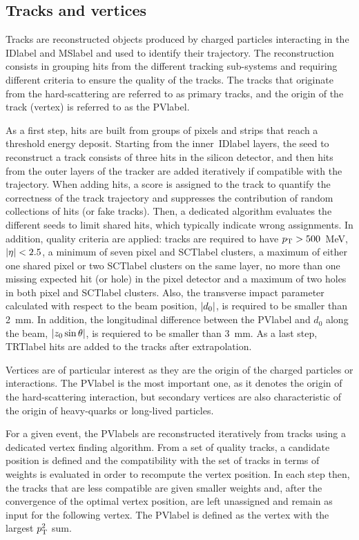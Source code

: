 \subsection{Tracks and vertices}

Tracks are reconstructed objects produced by charged particles interacting in the \acrshort{IDlabel} and \acrshort{MSlabel} and used to identify their trajectory. The reconstruction consists in grouping hits from the different tracking sub-systems and requiring different criteria to ensure the quality of the tracks. The tracks that originate from the hard-scattering are referred to as primary tracks, and the origin of the track (vertex) is referred to as the \acrfull{PVlabel}.

As a first step, hits are built from groups of pixels and strips that reach a threshold energy deposit. Starting from the inner~\acrshort{IDlabel} layers, the seed to reconstruct a track consists of three hits in the silicon detector, and then hits from the outer layers of the tracker are added iteratively if compatible with the trajectory. When adding hits, a score is assigned to the track to quantify the correctness of the track trajectory and suppresses the contribution of random collections of hits (or fake tracks). Then, a dedicated algorithm evaluates the different seeds to limit shared hits, which typically indicate wrong assignments. In addition, quality criteria are applied: tracks are required to have $p_{\text{T}}>500$~MeV, $\abs{\eta}<2.5$, a minimum of seven pixel and \acrshort{SCTlabel} clusters, a maximum of either one shared pixel or two \acrshort{SCTlabel} clusters on the same layer, no more than one missing expected hit (or hole) in the pixel detector and a maximum of two holes in both pixel and \acrshort{SCTlabel} clusters. Also, the transverse impact parameter calculated with respect to the beam position, $\abs{d_0}$, is required to be smaller than 2~mm. In addition, the longitudinal difference between the \acrshort{PVlabel} and $d_0$ along the beam, $\abs{z_0 \sin\theta}$, is requiered to be smaller than 3~mm. As a last step, \acrshort{TRTlabel} hits are added to the tracks after extrapolation.

Vertices are of particular interest as they are the origin of the charged particles or interactions. The \acrshort{PVlabel} is the most important one, as it denotes the origin of the hard-scattering interaction, but secondary vertices are also characteristic of the origin of heavy-quarks or long-lived particles.

For a given event, the \acrshort{PVlabel}s are reconstructed iteratively from tracks using a dedicated vertex finding algorithm. From a set of quality tracks, a candidate position is defined and the compatibility with the set of tracks in terms of weights is evaluated in order to recompute the vertex position. In each step then, the tracks that are less compatible are given smaller weights and, after the convergence of the optimal vertex position, are left unassigned and remain as input for the following vertex. The \acrshort{PVlabel} is defined as the vertex with the largest $p_{\text{T}}^2$ sum. 

